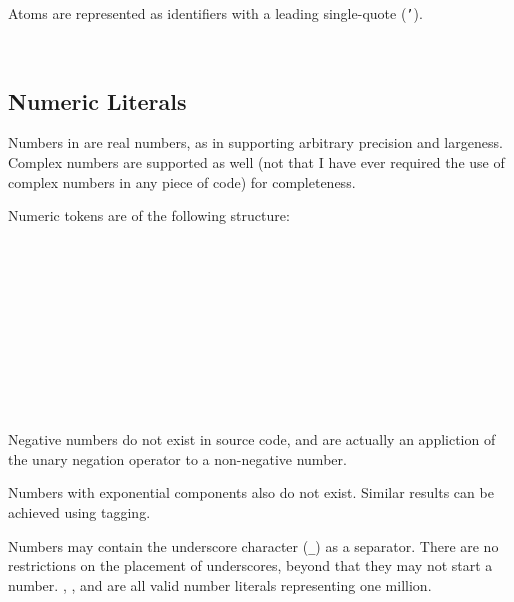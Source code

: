 Atoms are represented as identifiers with a leading single-quote (\texttt{'}).

\begin{bnf*}
     \\
\end{bnf*}

\subsection{Numeric Literals}

Numbers in \Trilogy{} are real numbers, as in supporting arbitrary
precision and largeness. Complex numbers are supported as well
(not that I have ever required the use of complex numbers in any
piece of code) for completeness.

Numeric tokens are of the following structure:

\begin{bnf*}
     \\
     \\
     \\
     \\
     \\
     \\
     \\
     \\
     \\
\end{bnf*}

Negative numbers do not exist in source code, and are actually
an appliction of the unary negation operator \op{-} to a non-negative number.

Numbers with exponential components also do not exist. Similar results
can be achieved using tagging.

Numbers may contain the underscore character (\texttt{\_}) as a separator.
There are no restrictions on the placement of underscores, beyond that they
may not start a number. , , and
 are all valid number literals representing one
million.

